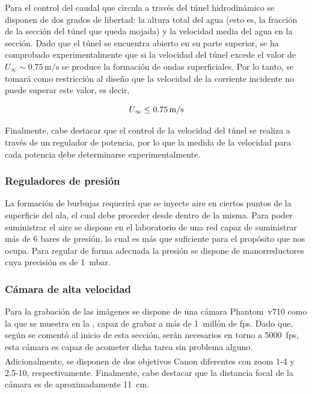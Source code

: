 Para el control del caudal que circula a través del túnel hidrodinámico se disponen de dos grados de libertad: la altura total del agua (esto es, la fracción de la sección del túnel que queda mojada) y la velocidad media del agua en la sección. Dado que el túnel se encuentra abierto en su parte superior, se ha comprobado experimentalmente que si la velocidad del túnel excede el valor de $U_{\infty} \sim 0.75\,\mathrm{m/s}$ se produce la formación de ondas superficiales. Por lo tanto, se tomará como restricción al diseño que la velocidad de la corriente incidente no puede superar este valor, es decir,

\begin{equation}
U_{\infty} \leq 0.75\,\mathrm{m/s}
\LABEQ{restrVel}
\end{equation}

Finalmente, cabe destacar que el control de la velocidad del túnel se realiza a través de un regulador de potencia, por lo que la medida de la velocidad para cada potencia debe determinarse experimentalmente. 

\subsubsection*{Reguladores de presión}

La formación de burbujas requerirá que se inyecte aire en ciertos puntos de la superficie del ala, el cual debe proceder desde dentro de la misma. Para poder suministrar el aire se dispone en el laboratorio de una red capaz de suministrar más de 6 bares de presión, lo cual es más que suficiente para el propósito que nos ocupa. Para regular de forma adecuada la presión se dispone de manorreductores cuya precisión es de 1~mbar. 

\subsubsection*{Cámara de alta velocidad}

Para la grabación de las imágenes se dispone de una cámara Phantom~v710 como la que se muestra en la , capaz de grabar a más de 1~millón de fps. Dado que, según se comentó al inicio de esta sección, serán necesarios en torno a 5000~fps, esta cámara es capaz de acometer dicha tarea sin problema alguno.  Adicionalmente, se disponen de dos objetivos Canon\textsuperscript{\textregistered} diferentes  con zoom 1-4 y 2.5-10, respectivamente. Finalmente, cabe destacar que la distancia focal de la cámara es de aproximadamente 11~cm.

